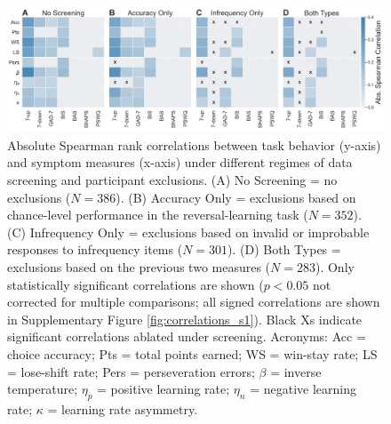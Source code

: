 \documentclass[a4paper,notitlepage,12pt]{article}
\begin{document}
\begin{refsection}[main]
\clearpage
\begin{figure}[h]
    \includegraphics[width=17cm]{../figures/main_03a.png}
    \centering
    \captionsetup{width=0.88\textwidth}
    \caption{Absolute Spearman rank correlations between task behavior (y-axis) and symptom measures (x-axis) under different regimes of data screening and participant exclusions. (A) No Screening = no exclusions ($N=386$). (B) Accuracy Only = exclusions based on chance-level performance in the reversal-learning task ($N=352$). (C) Infrequency Only = exclusions based on invalid or improbable responses to infrequency items ($N=301$). (D) Both Types = exclusions based on the previous two measures ($N=283$). Only statistically significant correlations are shown ($p<0.05$ not corrected for multiple comparisons; all signed correlations are shown in Supplementary Figure \ref{fig:correlations_s1}). Black Xs indicate significant correlations ablated under screening. Acronyms: Acc = choice accuracy; Pts = total points earned; WS = win-stay rate; LS = lose-shift rate; Pers = perseveration errors; $\beta$ = inverse temperature; $\eta_p$ = positive learning rate; $\eta_n$ = negative learning rate; $\kappa$ = learning rate asymmetry.}
    \label{fig:correlations}
\end{figure}


\end{refsection}
\end{document}
